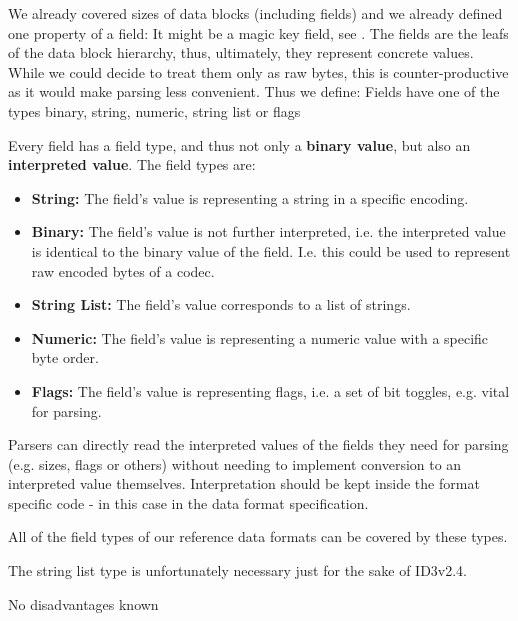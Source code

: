 We already covered sizes of data blocks (including fields) and we already defined one property of a field: It might be a magic key field, see . The fields are the leafs of the data block hierarchy, thus, ultimately, they represent concrete values. While we could decide to treat them only as raw bytes, this is counter-productive as it would make parsing less convenient. Thus we define:
{%
Fields have one of the types binary, string, numeric, string list or flags
}
{%
Every field has a field type, and thus not only a \textbf{binary value}, but also an \textbf{interpreted value}. The field types are:
\begin{itemize}
\item \textbf{String:} The field's value is representing a string in a specific encoding.
\item \textbf{Binary:} The field's value is not further interpreted, i.e. the interpreted value is identical to the binary value of the field. I.e. this could be used to represent raw encoded bytes of a codec.
\item \textbf{String List:} The field's value corresponds to a list of strings.
\item \textbf{Numeric:} The field's value is representing a numeric value with a specific byte order.
\item \textbf{Flags:} The field's value is representing flags, i.e. a set of bit toggles, e.g. vital for parsing. 
\end{itemize}
}
{%
Parsers can directly read the interpreted values of the fields they need for parsing (e.g. sizes, flags or others) without needing to implement conversion to an interpreted value themselves. Interpretation should be kept inside the format specific code - in this case in the data format specification.

All of the field types of our reference data formats can be covered by these types.

The string list type is unfortunately necessary just for the sake of ID3v2.4. 
}
{%
No disadvantages known
}

